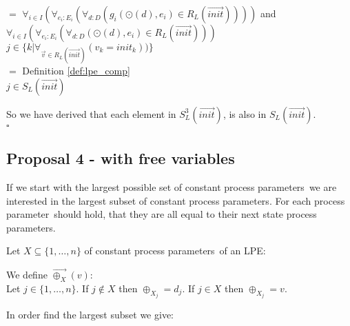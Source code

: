 \index{}\documentclass[a4paper,10pt]{article}
\theoremstyle{plain}
\theoremstyle{definition}
\newcommand{\ovr}{\overrightarrow}
\newcommand{\pp}{process parameter}
\newcommand{\pps}{process parameters}
\newcommand{\sq}{$\square$}
\begin{document}
\begin{defn}
\begin{tabbing}
\> $=$ \>  \>$\forall_{i\in I}(\forall_{e_i:E_i}(\forall_{d:D}( g_i(\odot(d),e_i) \in R_L(\ovr{init})))) $ and $\forall_{i\in I}(\forall_{e_i:E_i}(\forall_{d:D}( \odot(d),e_i) \in R_L(\ovr{init})))$\\
\> \> $j \in \lbrace k \vert \forall_{\ovr{v} \in R_L(\ovr{init})} (v_k = init_k)) \rbrace$\\
\> $=$ \> \>Definition \ref{def:lpe_comp}\\
\> \> $j \in S_L(\ovr{init})$
\end{tabbing}

So we have derived that each element in $S_L^3(\ovr{init})$, is also in $S_L(\ovr{init})$.
\\ \sq
\end{defn}

\subsection{Proposal 4 - with free variables}

If we start with the largest possible set of constant \pps\ we are interested in the largest subset of constant \pps . For each \pp\ should hold, that they are all equal to their next state \pps.

Let $X \subseteq \lbrace 1, \ldots, n \rbrace$ of constant \pps\ of an LPE:

\begin{defn} We define $\ovr{\oplus_X}(v)$:\\
Let $j \in \lbrace 1, \dots, n \rbrace $. 
If $j \not\in X$ then $\oplus_{X_j} = d_j$. 
If $j \in X$ then $\oplus_{X_j} = v$.
\end{defn}

In order find the largest subset we give: %
\end{document}
